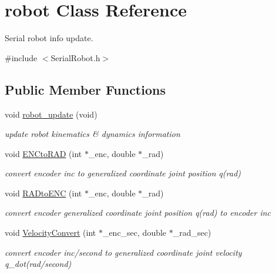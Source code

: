 \hypertarget{classrobot}{}\section{robot Class Reference}
\label{classrobot}


Serial robot info update.  




{\ttfamily \#include $<$Serial\+Robot.\+h$>$}

\subsection*{Public Member Functions}
\begin{DoxyCompactItemize}
\item 
\mbox{\label{classrobot_a7589b6397660143db4687161971dcd4d}} 
void \hyperlink{classrobot_a7589b6397660143db4687161971dcd4d}{robot\+\_\+update} (void)
\begin{DoxyCompactList}\small\item\em update robot kinematics \& dynamics information \end{DoxyCompactList}\item 
\mbox{\label{classrobot_a3be6dbd4c20dcc49e05f9dcea9331677}} 
void \hyperlink{classrobot_a3be6dbd4c20dcc49e05f9dcea9331677}{E\+N\+Cto\+R\+AD} (int $\ast$\+\_\+enc, double $\ast$\+\_\+rad)
\begin{DoxyCompactList}\small\item\em convert encoder inc to generalized coordinate joint position q(rad) \end{DoxyCompactList}\item 
\mbox{\label{classrobot_a8ac23a0972a5986615b9a4b6cbeb364d}} 
void \hyperlink{classrobot_a8ac23a0972a5986615b9a4b6cbeb364d}{R\+A\+Dto\+E\+NC} (int $\ast$\+\_\+enc, double $\ast$\+\_\+rad)
\begin{DoxyCompactList}\small\item\em convert encoder generalized coordinate joint position q(rad) to encoder inc \end{DoxyCompactList}\item 
\mbox{\label{classrobot_a9991d1ecabeabfc4e3c1236bc17283d2}} 
void \hyperlink{classrobot_a9991d1ecabeabfc4e3c1236bc17283d2}{Velocity\+Convert} (int $\ast$\+\_\+enc\+\_\+sec, double $\ast$\+\_\+rad\+\_\+sec)
\begin{DoxyCompactList}\small\item\em convert encoder inc/second to generalized coordinate joint velocity q\+\_\+dot(rad/second) \end{DoxyCompactList}\end{DoxyCompactItemize}

